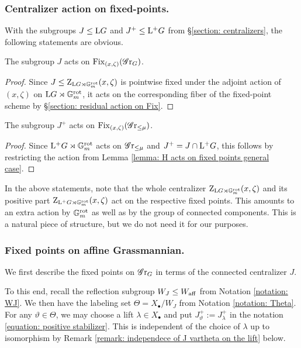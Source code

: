 \subsubsection{Centralizer action on fixed-points.}\label{section: the subgroup H^+}
With the subgroups $J \leq \mathrm{L} G$ and $J^+ \leq \mathrm{L^+} G$ from \S \ref{section: centralizers}, the following statements are obvious.
\begin{lemma}\label{lemma: H acts on fixed points general case}
The subgroup $J$ acts on $\operatorname{Fix}_{(x, \zeta)}(\operatorname{\mathscr{G}r}_G)$.
\end{lemma}
\begin{proof}
Since $J \leq \operatorname{Z}_{\mathrm{L} G \rtimes \mathbb{G}_m^{\mathrm{rot}}}(x, \zeta)$ is pointwise fixed under the adjoint action of $(x, \zeta)$ on $\mathrm{L} G \rtimes \mathbb{G}_m^{\mathrm{rot}}$, it acts on the corresponding fiber of the fixed-point scheme by \S \ref{section: residual action on Fix}.
\end{proof}
%
\begin{lemma}\label{lemma: H^+ acts on fixed points general case}
The subgroup $J^{+}$ acts on $\operatorname{Fix}_{(x, \zeta)}(\operatorname{\mathscr{G}r}_{\leq \mu})$. 
\end{lemma}
\begin{proof} 
Since $\mathrm{L^+} G\rtimes \mathbb{G}_m^{\mathrm{rot}}$ acts on $\operatorname{\mathscr{G}r}_{\leq \mu}$ and $J^+ = J \cap \mathrm{L^+} G$, this follows by restricting the action from Lemma \ref{lemma: H acts on fixed points general case}.
\end{proof}

\begin{remark}
In the above statements, note that the whole centralizer $\operatorname{Z}_{\mathrm{L} G \rtimes \mathbb{G}_m^{\mathrm{rot}}}(x, \zeta)$ and its positive part $\operatorname{Z}_{\mathrm{L^+} G \rtimes \mathbb{G}_m^{\mathrm{rot}}}(x, \zeta)$ act on the respective fixed points. This amounts to an extra action by $\mathbb{G}_m^{\mathrm{rot}}$ as well as by the group of connected components. This is a natural piece of structure, but we do not need it for our purposes.
\end{remark}







\subsubsection{Fixed points on affine Grassmannian.}
We first describe the fixed points on $\operatorname{\mathscr{G}r}_G$ in terms of the connected centralizer $J$. 

To this end, recall the reflection subgroup $W_J \leq W_{\mathrm{aff}}$ from Notation \ref{notation: WJ}. We then have the labeling set $\Theta = X_{\bullet}/W_J$ from Notation \ref{notation: Theta}. 
%
For any $\vartheta \in \Theta$, we may choose a lift $\lambda \in X_{\bullet}$ and put $J^+_{\vartheta} := J^+_{\lambda}$ in the notation \eqref{equation: positive stabilizer}. This is independent of the choice of $\lambda$ up to isomorphism by Remark \ref{remark: independece of J vartheta on the lift} below.


